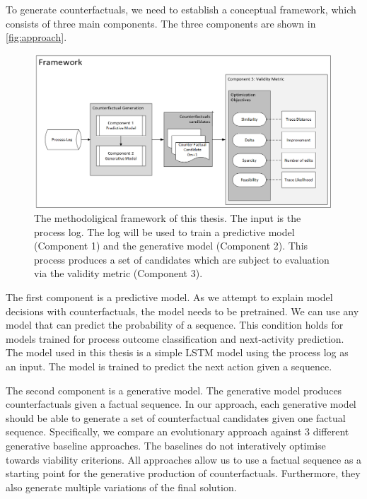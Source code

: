 \documentclass[./../../paper.tex]{subfiles}
\begin{document}
To generate counterfactuals, we need to establish a conceptual framework, which consists of three main components. The three components are shown in \autoref{fig:approach}. 

\begin{figure}[htb]
    \centering
    \includegraphics[width=0.99\textwidth]{figures/framework.png}
    \caption{The methodoligical framework of this thesis. The input is the process log. The log will be used to train a predictive model (Component 1) and the generative model (Component 2). This process produces a set of candidates which are subject to evaluation via the validity metric (Component 3).}
    \label{fig:approach}
\end{figure}

The first component is a predictive model. As we attempt to explain model decisions with counterfactuals, the model needs to be pretrained. We can use any model that can predict the probability of a sequence. This condition holds for models trained for process outcome classification and next-activity prediction. The model used in this thesis is a simple LSTM model using the process log as an input. The model is trained to predict the next action given a sequence. 

The second component is a generative model. The generative model produces counterfactuals given a factual sequence. In our approach, each generative model should be able to generate a set of counterfactual candidates given one factual sequence. Specifically, we compare an evolutionary approach against 3 different generative baseline approaches. The baselines do not interatively optimise towards viability criterions. All approaches allow us to use a factual sequence as a starting point for the generative production of counterfactuals. Furthermore, they also generate multiple variations of the final solution. 
\end{document}
